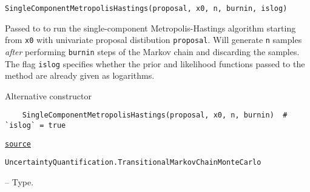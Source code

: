 \begin{adjustwidth}{2em}{0pt}


\begin{verbatim}
SingleComponentMetropolisHastings(proposal, x0, n, burnin, islog)
\end{verbatim}

Passed to  to run the single-component Metropolis-Hastings algorithm starting from \texttt{x0} with  univariate proposal distibution \texttt{proposal}. Will generate \texttt{n} samples \emph{after} performing \texttt{burnin} steps of the Markov chain and discarding the samples. The flag \texttt{islog} specifies whether the prior and likelihood functions passed to the   method are already  given as logarithms.

Alternative constructor


\begin{verbatim}
    SingleComponentMetropolisHastings(proposal, x0, n, burnin)  # `islog` = true
\end{verbatim}



\href{https://github.com/friesischscott/UncertaintyQuantification.jl/blob/f5ee6cce729f0d6a57979257379c942cdf42f86f/src/modelupdating/bayesianupdating.jl#L1-L12}{\texttt{source}}


\end{adjustwidth}
\hypertarget{14651864254862715180}{\texttt{UncertaintyQuantification.TransitionalMarkovChainMonteCarlo}}  -- {Type.}

